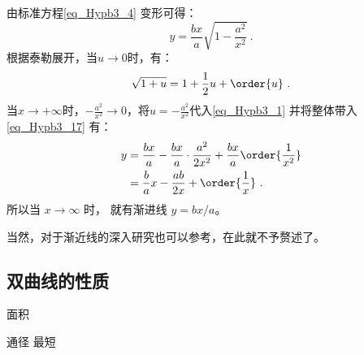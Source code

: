 由标准方程\autoref{eq_Hypb3_4} 变形可得：
\begin{equation}\label{eq_Hypb3_17}
y = \frac{bx}{a} \sqrt{1-\frac{a^2}{x^2}}~.
\end{equation}
根据泰勒展开，当$u\to 0$时，有：
\begin{equation}\label{eq_Hypb3_1}
\sqrt{1+u} = 1+\frac{1}{2}u+\order{u}~.
\end{equation}
当$x\to+\infty$时，$-\displaystyle\frac{a^2}{x^2}\to0$，将$\displaystyle u=-\frac{a^2}{x^2}$代入\autoref{eq_Hypb3_1} 并将整体带入\autoref{eq_Hypb3_17} 有：
\begin{equation}\label{eq_Hypb3_13}
\begin{split}
y &= \frac{bx}{a} -\frac{bx}{a} \cdot\frac{a^2}{2x^2}+\frac{bx}{a}\order{\frac{1}{x^2}}\\
& = \frac ba x - \frac{ab}{2x} + \order{\frac{1}{x}}~.
\end{split}
\end{equation}
所以当 $x\to\infty$ 时， 就有渐进线 $y = bx/a$。


当然，对于渐近线的深入研究也可以参考，在此就不予赘述了。

\subsection{双曲线的性质}
面积

通径
最短
